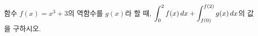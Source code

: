 함수 $f(x)=x^3+3$의 역함수를 $g(x)$라 할 때, $\displaystyle\int_{0}^{2} f(x)\mkern3mu dx+\int_{f(0)}^{f(2)} g(x)\mkern3mu dx$의 값을 구하시오.
